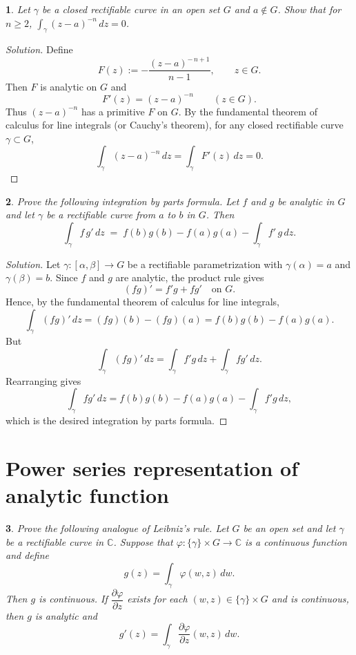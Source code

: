 \documentclass[12pt, a4paper]{report}
\theoremstyle{spaced}
\newtheorem{exercise}{}
\newcommand{\setexercise}[1]{\setcounter{exercise}{#1-1}}
\begin{document}
\setexercise{22}
\begin{exercise}
	Let $\gamma$ be a closed rectifiable curve in an open set $G$ and $a\notin G$. Show that for $n\ge 2$, $\displaystyle\int_\gamma (z-a)^{-n}\,dz=0$.
\end{exercise}

\begin{proof}[Solution]
	Define
	\[
		F(z) := -\frac{(z-a)^{-\,n+1}}{\,n-1\,}, \qquad z \in G.
	\]
	Then \(F\) is analytic on \(G\) and
	\[
		F'(z) = (z-a)^{-n} \qquad (z \in G).
	\]
	Thus \((z-a)^{-n}\) has a primitive \(F\) on \(G\). By the fundamental theorem of
	calculus for line integrals (or Cauchy's theorem), for any closed rectifiable
	curve \(\gamma \subset G\),
	\[
		\int_\gamma (z-a)^{-n}\,dz
		= \int_\gamma F'(z)\,dz
		= 0.
	\]
\end{proof}

\setexercise{23}
\begin{exercise}
	Prove the following integration by parts formula. Let $f$ and $g$ be analytic in $G$ and let $\gamma$ be a rectifiable curve from $a$ to $b$ in $G$. Then
	\[
		\int_{\gamma} f\,g' \, dz \;=\; f(b)g(b)-f(a)g(a)-\int_{\gamma} f'\,g \, dz.
	\]
\end{exercise}

\begin{proof}[Solution]
	Let \(\gamma:[\alpha,\beta]\to G\) be a rectifiable parametrization with
	\(\gamma(\alpha)=a\) and \(\gamma(\beta)=b\).
	Since \(f\) and \(g\) are analytic, the product rule gives
	\[
		(fg)' = f'g + fg' \quad \text{on } G.
	\]
	Hence, by the fundamental theorem of calculus for line integrals,
	\[
		\int_\gamma (fg)' \, dz
		= (fg)(b) - (fg)(a)
		= f(b)g(b) - f(a)g(a).
	\]
	But
	\[
		\int_\gamma (fg)'\,dz
		= \int_\gamma f'g \, dz + \int_\gamma fg' \, dz.
	\]
	Rearranging gives
	\[
		\int_\gamma fg' \, dz
		= f(b)g(b) - f(a)g(a) - \int_\gamma f'g \, dz,
	\]
	which is the desired integration by parts formula.
\end{proof}


\section{Power series representation of analytic function}
\setexercise{2}
\begin{exercise}
	Prove the following analogue of Leibniz's rule.
	Let $G$ be an open set and let $\gamma$ be a rectifiable curve in $\mathbb{C}$.
	Suppose that $\varphi : \{\gamma\} \times G \to \mathbb{C}$ is a continuous function and define
	\[
		g(z) = \int_{\gamma} \varphi(w,z)\,dw.
	\]
	Then $g$ is continuous. If $\dfrac{\partial \varphi}{\partial z}$ exists for each $(w,z) \in \{\gamma\} \times G$ and is continuous,
	then $g$ is analytic and
	\[
		g'(z) = \int_{\gamma} \frac{\partial \varphi}{\partial z}(w,z)\,dw.
	\]
\end{exercise}
\end{document}
